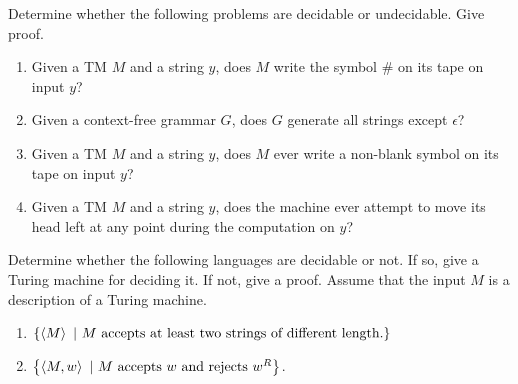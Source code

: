 \documentclass{article}
\begin{document}
\begin{exercise}
Determine whether the following problems are decidable or undecidable. Give proof.
\begin{enumerate}
 \item Given a TM $M$ and a string $y$, does $M$ write the symbol $\#$ on its tape on input $y$?
 \item Given a context-free grammar $G$, does $G$ generate all strings except $\epsilon$?
 \item Given a TM $M$ and a string $y$, does $M$ ever write a non-blank symbol on its tape on input $y$?
 \item Given a TM $M$ and a string $y$, does the machine ever attempt to move its head left at any point during the computation on $y$?
\end{enumerate}
\end{exercise}

\begin{exercise}
Determine whether the following languages are decidable or not. If so, give a Turing machine for deciding it. If not, give a proof. Assume that the input $M$ is a description of a Turing machine.
\begin{enumerate}
 \item $\left\{ \left\langle M \right\rangle\ |\ \mbox{$M$ accepts at least two strings of different length.} \right\}$
 \item $\left\{ \left\langle M,w \right\rangle\ |\ \mbox{$M$ accepts $w$ and rejects $w^R$} \right\}$.
\end{enumerate}
\end{exercise}
\end{document}
